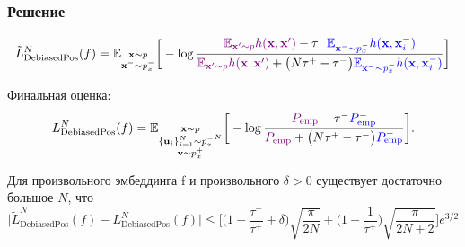 \documentclass[
	11pt, %
]{beamer}
\begin{document}
\begin{frame}
    \frametitle{Решение}
\scriptsize

\begin{equation*}
\tilde{L}_{\text{DebiasedPos}}^N (f) = \mathbb{E}_{\substack{\textbf{x} \sim p \\ \textbf{x}^- \sim p_x^-}} \bigg[ - \log \frac{\color{violet} \mathbb{E}_{\textbf{x}' \sim p} h(\textbf{x}, \textbf{x}') \color{black} - \tau^- \color{blue} \mathbb{E}_{\textbf{x}^- \sim p_x^-} h(\textbf{x}, \textbf{x}_i^-)}{\color{violet} \mathbb{E}_{\textbf{x}' \sim p} h(\textbf{x}, \textbf{x}') \color{black} + \big(N \tau^+ - \tau^-\big) \color{blue} \mathbb{E}_{\textbf{x}^- \sim p_x^-} h(\textbf{x}, \textbf{x}_i^-)}\bigg]
\end{equation*}

Финальная оценка:
\begin{equation*}
L_{\text{DebiasedPos}}^N (f) = \mathbb{E}_{\substack{\textbf{x} \sim p \\ \{\textbf{u}_i\}_{i=1}^N \sim {p_x^-}^N \\ \textbf{v} \sim p_x^+}} \bigg[-\log \frac{\color{violet}P_{\text{emp}} \color{black} - \tau^- \color{blue} P_{\text{emp}}^-} {\color{violet}P_{\text{emp}} \color{black} + \big(N \tau^+ - \tau^-\big) \color{blue} P_{\text{emp}}^- }\bigg].
\end{equation*}

\begin{theorem}
Для произвольного эмбеддинга f и произвольного $\delta > 0$ существует достаточно большое $N$, что
\begin{equation*}
\big|\tilde{L}_{\text{DebiasedPos}}^N (f) - L_{\text{DebiasedPos}}^N (f)\big| \leq \bigg[\bigg(1 + \frac{\tau^-}{\tau^+} + \delta\bigg) \sqrt{\frac{\pi}{2N}} + \bigg(1 + \frac{1}{\tau^+}\bigg) \sqrt{\frac{\pi}{2N + 2}}\bigg] e^{3/2}
\end{equation*}
\end{theorem}


\end{frame}



\end{document}
